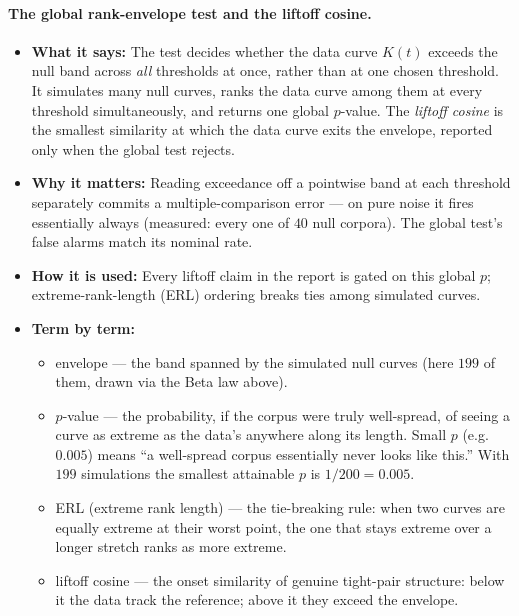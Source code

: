 \documentclass[11pt,letterpaper]{article}
\begin{document}
\paragraph{The global rank-envelope test and the liftoff cosine.}
\begin{itemize}
  \item \textbf{What it says:} The test decides whether the data curve $K(t)$ exceeds the null band
  across \emph{all} thresholds at once, rather than at one chosen
  threshold. It simulates many null curves, ranks the data curve among
  them at every threshold simultaneously, and returns one global
  $p$-value. The \emph{liftoff cosine} is the smallest similarity at
  which the data curve exits the envelope, reported only when the global
  test rejects.
  \item \textbf{Why it matters:} Reading exceedance off a pointwise band at
  each threshold separately commits a multiple-comparison error --- on pure
  noise it fires essentially always (measured: every one of $40$ null
  corpora). The global test's false alarms match its nominal rate.
  \item \textbf{How it is used:} Every liftoff claim in the report is gated
  on this global $p$; extreme-rank-length (ERL) ordering breaks ties among
  simulated curves.
  \item \textbf{Term by term:}
  \begin{itemize}
    \item envelope --- the band spanned by the simulated null curves
    (here $199$ of them, drawn via the Beta law above).
    \item $p$-value --- the probability, if the corpus were truly
    well-spread, of seeing a curve as extreme as the data's anywhere along
    its length. Small $p$ (e.g.\ $0.005$) means ``a well-spread corpus
    essentially never looks like this.'' With $199$ simulations the
    smallest attainable $p$ is $1/200 = 0.005$.
    \item ERL (extreme rank length) --- the tie-breaking rule: when two
    curves are equally extreme at their worst point, the one that stays
    extreme over a longer stretch ranks as more extreme.
    \item liftoff cosine --- the onset similarity of genuine tight-pair
    structure: below it the data track the reference; above it they exceed
    the envelope.
  \end{itemize}
\end{itemize}
\end{document}
